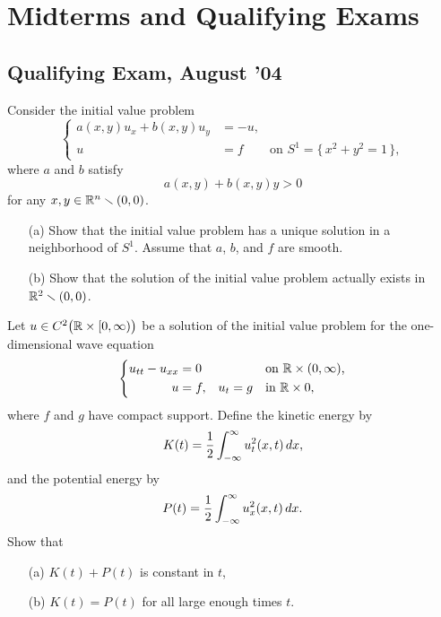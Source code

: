 \chapter{Midterms and Qualifying Exams}
\section{Qualifying Exam, August '04}
\begin{problem}
  Consider the initial value problem
  \[
    \left\{
      \begin{aligned}
        a(x,y)u_x+b(x,y)u_y&=-u,\\
        u&=f&\text{on \(S^1=\bigl\{\,x^2+y^2=1\,\bigr\}\)},
      \end{aligned}
    \right.
  \]
  where \(a\) and \(b\) satisfy
  \[
    a(x,y)+b(x,y)y>0
  \]
  for any \(x,y\in\mathbb{R}^n\smallsetminus(0,0)\).
  \begin{itemize}[noitemsep]
  \item[(a)] Show that the initial value problem has a unique solution in a
    neighborhood of \(S^1\). Assume that \(a\), \(b\), and \(f\) are
    smooth.
  \item[(b)] Show that the solution of the initial value problem actually
    exists in \(\mathbb{R}^2\smallsetminus(0,0)\).
  \end{itemize}
\end{problem}
\begin{solution}
\end{solution}

\begin{problem}
  Let \(u\in C^2\bigl(\mathbb{R}\times[0,\infty)\bigr)\) be a solution of the
  initial value problem for the one-dimensional wave equation
  \[
    \left\{
      \begin{aligned}
        u_{tt}-u_{xx}&=0&&&&\text{on \(\mathbb{R}\times(0,\infty)\),}\\
        u&=f,&u_t&=g&&\text{in \(\mathbb{R}\times 0\),}
      \end{aligned}
    \right.
  \]
  where \(f\) and \(g\) have compact support. Define the kinetic energy by
  \[
    K(t)=\frac{1}{2}\int_{-\infty}^\infty u_t^2(x,t)\mathop{}\!d x,
  \]
  and the potential energy by
  \[
    P(t)=\frac{1}{2}\int_{-\infty}^\infty u_x^2(x,t)\mathop{}\!d x.
  \]
  Show that
  \begin{itemize}[noitemsep]
  \item[(a)] \(K(t)+P(t)\) is constant in \(t\),
  \item[(b)] \(K(t)=P(t)\) for all large enough times \(t\).
  \end{itemize}
\end{problem}
\begin{solution}
\end{solution}

